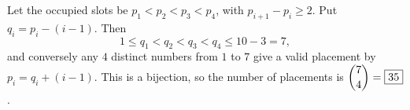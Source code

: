 Let the occupied slots be $p_1<p_2<p_3<p_4$, with $p_{i+1}-p_i\ge2$. Put $q_i=p_i-(i-1)$. Then
\[1\le q_1<q_2<q_3<q_4\le10-3=7,\]
and conversely any $4$ distinct numbers from $1$ to $7$ give a valid placement by $p_i=q_i+(i-1)$. This is a bijection, so the number of placements is $\dbinom74=\boxed{35}$.
